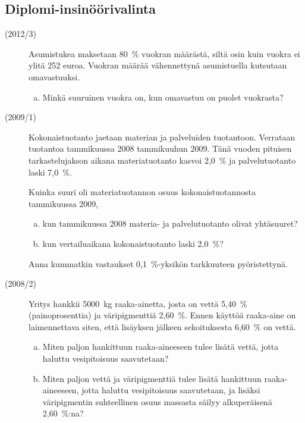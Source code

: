 \subsection{Diplomi-insinöörivalinta}
\begin{description}
	\item[(2012/3)] Asumistukea maksetaan 80~\% vuokran määrästä, siltä osin kuin
        vuokra ei ylitä 252 euroa. Vuokran määrää vähennettynä asumistuella
        kutsutaan omavastuuksi.
        
		\begin{enumerate}[(a)]
			\item Minkä suuruinen vuokra on, kun omavastuu on puolet vuokrasta?
		\end{enumerate}
	
	\item[(2009/1)] Kokonaistuotanto jaetaan materian ja palveluiden tuotantoon.
        Verrataan tuotantoa tammikuussa 2008 tammikuuhun 2009. Tänä vuoden pituisen
        tarkastelujakson aikana materiatuotanto kasvoi 2,0~\% ja palvelutuotanto laski 7,0~\%.
	
	   Kuinka suuri oli materiatuotannon osuus kokonaistuotannosta tammikuussa 2009,
	   
    	\begin{enumerate}[(a)]
    		\item kun tammikuussa 2008 materia- ja palvelutuotanto olivat yhtäsuuret?
    		\item kun vertailuaikana kokonaistuotanto laski 2,0~\%?
    	\end{enumerate}
    	
	   Anna kummatkin vastaukset 0,1~\%-yksikön tarkkuuteen pyöristettynä.

	\item[(2008/2)] Yritys hankkii 5000~kg raaka-ainetta, josta on vettä 5,40~\%
        (painoprosenttia) ja väripigmenttiä 2,60~\%. Ennen käyttöä raaka-aine on
        laimennettava siten, että lisäyksen jälkeen sekoituksesta 6,60~\% on vettä.
	
    	\begin{enumerate}[(a)]
    		\item Miten paljon hankittuun raaka-aineeseen tulee lisätä vettä,
                jotta haluttu vesipitoisuus saavutetaan?
    		\item Miten paljon vettä ja väripigmenttiä tulee lisätä hankittuun
                raaka-aineeseen, jotta haluttu vesipitoisuus saavutetaan, ja lisäksi
                väripigmentin suhteellinen osuus massasta säilyy alkuperäisenä 2,60~\%:na?
    	\end{enumerate}
    	

\end{description}
